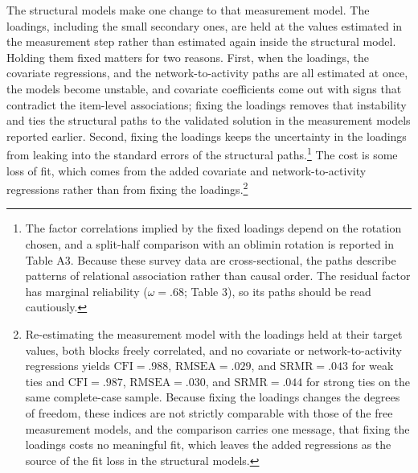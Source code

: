 \documentclass[
  12pt
]{article}
\begin{document}
The structural models make one change to that measurement model. The loadings, including the small secondary ones, are held at the values estimated in the measurement step rather than estimated again inside the structural model. Holding them fixed matters for two reasons. First, when the loadings, the covariate regressions, and the network-to-activity paths are all estimated at once, the models become unstable, and covariate coefficients come out with signs that contradict the item-level associations; fixing the loadings removes that instability and ties the structural paths to the validated solution in the measurement models reported earlier. Second, fixing the loadings keeps the uncertainty in the loadings from leaking into the standard errors of the structural paths.\footnote{The factor correlations implied by the fixed loadings depend on the rotation chosen, and a split-half comparison with an oblimin rotation is reported in Table A3. Because these survey data are cross-sectional, the paths describe patterns of relational association rather than causal order. The residual factor has marginal reliability ($\omega = .68$; Table 3), so its paths should be read cautiously.} The cost is some loss of fit, which comes from the added covariate and network-to-activity regressions rather than from fixing the loadings.\footnote{Re-estimating the measurement model with the loadings held at their target values, both blocks freely correlated, and no covariate or network-to-activity regressions yields $\text{CFI} = .988$, $\text{RMSEA} = .029$, and $\text{SRMR} = .043$ for weak ties and $\text{CFI} = .987$, $\text{RMSEA} = .030$, and $\text{SRMR} = .044$ for strong ties on the same complete-case sample. Because fixing the loadings changes the degrees of freedom, these indices are not strictly comparable with those of the free measurement models, and the comparison carries one message, that fixing the loadings costs no meaningful fit, which leaves the added regressions as the source of the fit loss in the structural models.}
\end{document}

